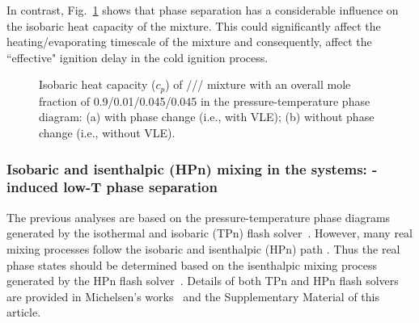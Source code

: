     In contrast, Fig.~\ref{fig:PTdiagram_cp} shows that phase separation has a considerable influence on the isobaric heat capacity of the mixture. This could significantly affect the heating/evaporating timescale of the mixture and consequently, affect the ``effective" ignition delay in the cold ignition process.

    \begin{figure}[htb]
        \centering


        \caption{Isobaric heat capacity ($c_p$) of /// mixture with an overall mole fraction of 0.9/0.01/0.045/0.045 in the pressure-temperature phase diagram: (a) with phase change (i.e., with VLE); (b) without phase change (i.e., without VLE).}
        \label{fig:PTdiagram_cp}
    \end{figure}


\subsubsection{Isobaric and isenthalpic (HPn) mixing in the  systems: -induced low-T phase separation} \label{sec:results:combustor:HPn}
The previous analyses %
are based on the pressure-temperature phase diagrams generated by the isothermal and isobaric (TPn) flash solver~\cite{michelsen1982isothermal}.
However, many real mixing processes follow the isobaric and isenthalpic (HPn) path \cite{serrano2018development}. Thus the real phase states should be determined based on the isenthalpic mixing process generated by the HPn flash solver~\cite{michelsen1987multiphase}. Details of both TPn and HPn flash solvers are provided in Michelsen's works~\cite{michelsen1982isothermal,michelsen1987multiphase} and the Supplementary Material of this article.

